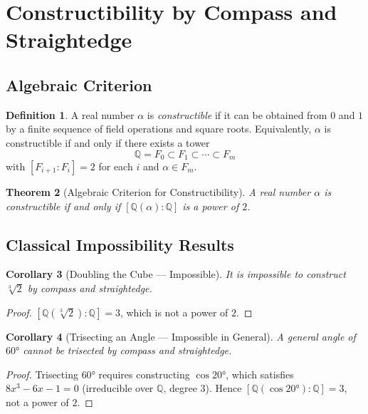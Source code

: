 \documentclass[12pt,a4paper]{amsart}
\newtheorem{theorem}{Theorem}[section]
\newtheorem{corollary}[theorem]{Corollary}
\theoremstyle{definition}
\newtheorem{definition}[theorem]{Definition}
\newcommand{\Q}{\mathbb{Q}}
\begin{document}
\section{Constructibility by Compass and Straightedge}

\subsection{Algebraic Criterion}

\begin{definition}
A real number $\alpha$ is \emph{constructible} if it can be obtained from $0$
and $1$ by a finite sequence of field operations and square roots. Equivalently,
$\alpha$ is constructible if and only if there exists a tower
\[
  \Q = F_0 \subset F_1 \subset \cdots \subset F_m
\]
with $[F_{i+1}:F_i] = 2$ for each $i$ and $\alpha \in F_m$.
\end{definition}

\begin{theorem}[Algebraic Criterion for Constructibility]
\label{thm:constructible}
A real number $\alpha$ is constructible if and only if $[\Q(\alpha):\Q]$ is a
power of $2$.
\end{theorem}

\subsection{Classical Impossibility Results}

\begin{corollary}[Doubling the Cube — Impossible]
It is impossible to construct $\sqrt[3]{2}$ by compass and straightedge.
\end{corollary}

\begin{proof}
$[\Q(\sqrt[3]{2}):\Q] = 3$, which is not a power of $2$.
\end{proof}

\begin{corollary}[Trisecting an Angle — Impossible in General]
A general angle of $60°$ cannot be trisected by compass and straightedge.
\end{corollary}

\begin{proof}
Trisecting $60°$ requires constructing $\cos 20°$, which satisfies
$8x^3 - 6x - 1 = 0$ (irreducible over $\Q$, degree 3). Hence
$[\Q(\cos 20°):\Q] = 3$, not a power of $2$.
\end{proof}
\end{document}
